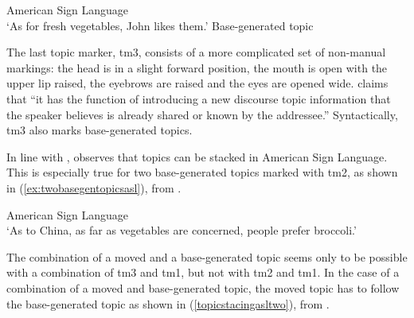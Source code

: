  

\begin{exe}
\ex American Sign Language \\  
\glt `As for fresh vegetables, John likes them.' \label{ex:topicaaronscnewmoved} \hfill Base-generated topic
\end{exe} 

\noindent The last topic marker, tm3, consists of a more complicated set of non-manual markings: the head is in a slight forward position, the mouth is open with the upper lip raised, the eyebrows are raised and the eyes are opened wide. \citet[81]{aarons1996topics} claims that ``it has the function of introducing a new discourse topic information that the speaker believes is already shared or known by the addressee.'' Syntactically, tm3 also marks base-generated topics.

In line with \citet{rizzi1997fine}, \citet{aarons1996topics} observes that topics can be stacked in American Sign Language. This is especially true for two base-generated topics marked with tm2, as shown in (\ref{ex:twobasegentopicsasl}), from \citet[90]{aarons1996topics}.

\begin{exe}
\ex American Sign Language  \\   
\glt `As to China, as far as vegetables are concerned, people prefer broccoli.' \label{ex:twobasegentopicsasl} 
\end{exe} 

\noindent The combination of a moved and a base-generated topic seems only to be possible with a combination of tm3 and tm1, but not with tm2 and tm1. In the case of a combination of a moved and base-generated topic, the moved topic has to follow the base-generated topic as shown in (\ref{topicstacingasltwo}), from \citet[94]{aarons1996topics}.

